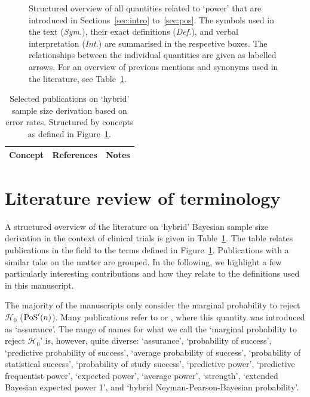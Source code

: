 \documentclass{article}
\begin{document}
\begin{figure}
\centering
\resizebox{0.925\textwidth}{!}{}
\caption{Structured overview of all quantities related to `power' that are introduced in Sections~\ref{sec:intro} to~\ref{sec:pos}. The symbols used in the text (\textit{Sym.}), their exact definitions (\textit{Def.}), and verbal interpretation (\textit{Int.}) are summarised in the respective boxes. The relationships between the individual quantities are given as labelled arrows.
For an overview of previous mentions and synonyms used in the literature, see Table~\ref{tab:literature-overview}.}
\label{fig:diagram}
\end{figure}



\begin{center}
\renewcommand{\arraystretch}{1.5}
\begin{longtable}{p{3cm}p{4cm}p{8cm}}
    \caption{%
        Selected publications on `hybrid' sample size derivation based on error rates. Structured by concepts as defined in Figure~\protect\ref{fig:diagram}.
    }%
    \label{tab:literature-overview}\\

    \textbf{Concept} & \textbf{References} & \textbf{Notes} \\
    \hline
    \endfirsthead

    

\end{longtable}
\end{center}



\section{Literature review of terminology}
\label{sec:literature}

A structured overview of the literature on `hybrid' Bayesian sample size derivation in the context of clinical trials is given
in Table~\ref{tab:literature-overview}.
The table relates publications in the field to the terms defined
in Figure~\ref{fig:diagram}.
Publications with a similar take on the matter are grouped.
In the following, we highlight a few particularly interesting contributions and how they relate to the definitions used in this manuscript.

The majority of the manuscripts only consider
the marginal probability to reject $\mathcal{H}_0$ ($\operatorname{PoS}'(n)$).
Many publications refer to \citet{o2001bayesian} or \citet{ohagan-2005},
where this quantity was introduced as `assurance'.
The range of names for what we call the `marginal probability to reject $\mathcal{H}_0$' is, however, quite diverse:
`assurance', `probability of success',
`predictive probability of success', `average probability of success', `probability of statistical success', `probability of study success', `predictive power', `predictive frequentist power', `expected power', `average power', `strength', `extended Bayesian expected power 1', and `hybrid Neyman-Pearson-Bayesian probability'.
\end{document}
